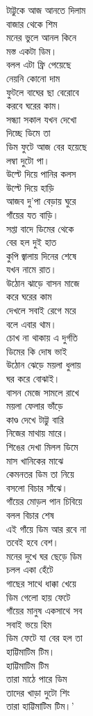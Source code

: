 \documentclass[a4paper,10 pt]{article}
\begin{document}
\begin{center}
টাট্টুকে আজ আনতে দিলাম\\
বাজার থেকে শিম\\
মনের ভুলে আনল কিনে\\
মস্ত একটা ডিম।\\
বলল এটা ফ্রি পেয়েছে\\
নেয়নি কোনো দাম\\
ফুটলে বাঘের ছা বেরোবে\\
করবে ঘরের কাম।\\
সন্ধ্যা সকাল যখন দেখো\\
দিচ্ছে ডিমে তা\\
ডিম ফুটে আজ বের হয়েছে\\
লম্বা দুটো পা।\\
উল্টে দিয়ে পানির কলস\\
উল্টে দিয়ে হাড়ি\\
আজব দু'পা বেড়ায় ঘুরে\\
গাঁয়ের যত বাড়ি।\\
সপ্তা বাদে ডিমের থেকে\\
বের হল দুই হাত\\
কুপি জ্বালায় দিনের শেষে\\
যখন নামে রাত।\\
উঠোন ঝাড়ে বাসন মাজে\\
করে ঘরের কাম\\
দেখলে সবাই রেগে মরে\\
বলে এবার থাম।\\
চোখ না থাকায় এ দুর্গতি\\
ডিমের কি দোষ ভাই\\
উঠোন ঝেড়ে ময়লা ধুলায়\\
ঘর করে বোঝাই।\\
বাসন মেজে সামলে রাখে\\
ময়লা ফেলার ভাঁড়ে\\
কাণ্ড দেখে টাট্টু বারি\\
নিজের মাথায় মারে।\\
শিঙের দেখা মিলল ডিমে\\
মাস খানিকের মাঝে\\
কেমনতর ডিম তা নিয়ে\\
বসলো বিচার সাঁঝে।\\
গাঁয়ের মোড়ল পান চিবিয়ে\\
বলল বিচার শেষ\\
এই গাঁয়ে ডিম আর রবে না\\
তবেই হবে বেশ।\\
মনের দুখে ঘর ছেড়ে ডিম\\
চলল একা হেঁটে\\
গাছের সাথে ধাক্কা খেয়ে\\
ডিম গেলো হায় ফেটে\\
গাঁয়ের মানুষ একসাথে সব\\
সবাই ভয়ে হিম\\
ডিম ফেটে যা বের হল তা\\
হাট্টিমাটিম টিম।\\
হাট্টিমাটিম টিম\\
তারা মাঠে পারে ডিম\\
তাদের খাড়া দুটো শিং\\
তারা হাট্টিমাটিম টিম।'

\end{center}
\end{document}
